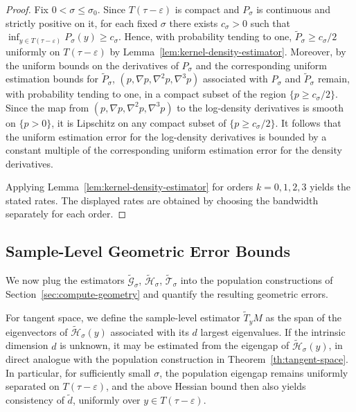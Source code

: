 \documentclass[11pt]{article}
\theoremstyle{plain}
\theoremstyle{definition}
\begin{document}
\begin{proof}
Fix $0<\sigma\le \sigma_0$. Since $T(\tau-\varepsilon )$ is compact and $P_\sigma$ is continuous and strictly positive on it, for each fixed $\sigma$ there exists $c_\sigma>0$ such that $\inf_{y\in T(\tau-\varepsilon )} P_\sigma(y)\ge c_\sigma$. Hence, with probability tending to one, $\widetilde P_\sigma\ge {c_\sigma}/{2}$ uniformly on $T(\tau-\varepsilon )$ by Lemma~\ref{lem:kernel-density-estimator}. 
Moreover, by the uniform bounds on the derivatives of $P_\sigma$ and the corresponding uniform estimation bounds for $\widetilde P_\sigma$, $(p,\nabla p,\nabla^2 p,\nabla^3 p)$ associated with $P_\sigma$ and $\widetilde P_\sigma$ remain, with probability
tending to one, in a compact subset of the region $\{p\ge c_\sigma/2\}$. Since the map from $(p,\nabla p,\nabla^2 p,\nabla^3 p)$ to the log-density
derivatives is smooth on $\{p> 0\}$, it is Lipschitz on any compact subset of $\{p\ge c_\sigma/2\}$.
It follows that the uniform estimation error for the log-density derivatives is bounded by a constant multiple of the corresponding uniform estimation error for the density derivatives.

Applying Lemma~\ref{lem:kernel-density-estimator} for orders $k=0,1,2,3$ yields the stated rates. The displayed rates are obtained by choosing the bandwidth separately for each order.
\end{proof}

\subsection{Sample-Level Geometric Error Bounds}\label{sec:final bounds}
We now plug the estimators $\widetilde{\mathcal G}_\sigma$, $\widetilde{\mathcal{H}}_\sigma$, $\widetilde{\mathcal{T}}_\sigma$ into the population constructions of Section~\ref{sec:compute-geometry} and quantify the resulting geometric errors. 

For tangent space, we define the sample-level  estimator $\widetilde{T}_yM$ as the span of the eigenvectors of $\widetilde{\mathcal{H}}_\sigma(y)$ associated with its $d$ largest eigenvalues. If the intrinsic dimension $d$ is unknown, it may be estimated from the eigengap of $\widetilde{\mathcal H}_\sigma(y)$, in direct analogue with the population construction in Theorem~\ref{th:tangent-space}. In particular, for sufficiently small $\sigma$, the population eigengap remains uniformly separated on $T(\tau-\varepsilon)$, and the above Hessian bound then also yields consistency of $\widetilde d$, uniformly over $y\in T(\tau-\varepsilon)$.
\end{document}

